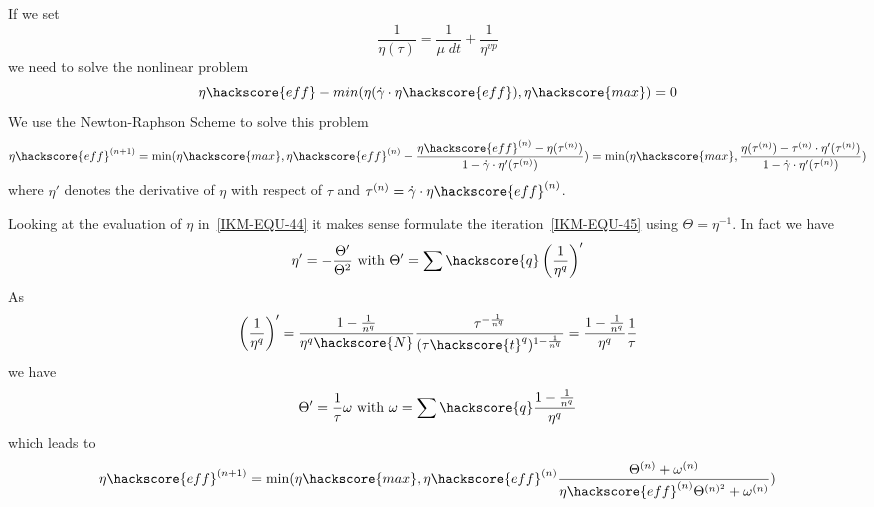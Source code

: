 If we set 
\begin{equation}\label{IKM-EQU-44}
\frac{1}{\eta(\tau)}= \frac{1}{\mu \; dt}+\frac{1}{\eta^{vp}}
\end{equation}
we need to solve the nonlinear problem
\begin{equation}
\eta\hackscore{eff} -  min(\eta( \dot{\gamma} \cdot \eta\hackscore{eff}) 
, \eta\hackscore{max}) =0 
\end{equation}
We use the Newton-Raphson Scheme  to solve this problem
\begin{equation}\label{IKM-EQU-45}
\eta\hackscore{eff}^{(n+1)} = \min(\eta\hackscore{max}, 
\eta\hackscore{eff}^{(n)} -
\frac{\eta\hackscore{eff}^{(n)} - \eta( \tau^{(n)}) }
{1-\dot{\gamma} \cdot \eta'( \tau^{(n)} )} )
=\min(\eta\hackscore{max},
\frac{\eta( \tau^{(n)}) -\tau^{(n)} \cdot  \eta'( \tau^{(n)} )  }
{1-\dot{\gamma} \cdot \eta'( \tau^{(n)} )} )
\end{equation} 
where $\eta'$ denotes the derivative of $\eta$ with respect of $\tau$
and $\tau^{(n)} =  \dot{\gamma} \cdot \eta\hackscore{eff}^{(n)}$. 

Looking at the evaluation of $\eta$ in~\ref{IKM-EQU-44} it makes sense formulate
the iteration~\ref{IKM-EQU-45} using $\Theta=\eta^{-1}$. 
In fact we have 
\begin{equation}
\eta' = - \frac{\Theta'}{\Theta^2} 
\mbox{ with } 
\Theta' = \sum\hackscore{q} \left(\frac{1}{\eta^{q}} \right)'
\label{IKM iteration 7}
\end{equation} 
As
\begin{equation}\label{IKM-EQU-47}
\left(\frac{1}{\eta^{q}} \right)'
= \frac{1-\frac{1}{n^{q}}}{\eta^{q}\hackscore{N}} \frac{\tau^{-\frac{1}{n^{q}}}}{(\tau\hackscore{t}^q)^{1-\frac{1}{n^{q}}}}
= \frac{1-\frac{1}{n^{q}}}{\eta^{q}}\frac{1}{\tau} 
\end{equation}
we have
\begin{equation}\label{IKM-EQU-48}
\Theta' = \frac{1}{\tau} \omega \mbox{ with } \omega = \sum\hackscore{q}\frac{1-\frac{1}{n^{q}}}{\eta^{q}} 
\end{equation}
which leads to 
\begin{equation}\label{IKM-EQU-49}
\eta\hackscore{eff}^{(n+1)} = \min(\eta\hackscore{max}, 
\eta\hackscore{eff}^{(n)}
\frac{\Theta^{(n)}  + \omega^{(n)}  }
{\eta\hackscore{eff}^{(n)} \Theta^{(n)^2}+\omega^{(n)} })
\end{equation} 